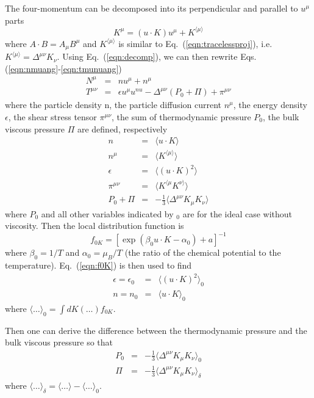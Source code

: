 \documentclass[aps,article]{revtex4}
\begin{document}
The four-momentum can be decomposed into its perpendicular and parallel to $u^{\mu}$ parts
\begin{equation}\label{eqn:decomp}
K^{\mu}=(u\cdot K)u^{\mu}+K^{\langle \mu\rangle}
\end{equation}
where $A\cdot B=A_{\mu}B^{\mu}$ and $K^{\langle \mu\rangle}$ is similar to Eq.\ (\ref{eqn:tracelessproj}), i.e. $K^{\langle \mu\rangle}=\Delta^{\mu\nu}K_{\nu}$.  Using Eq.\ (\ref{eqn:decomp}), we can then rewrite Eqs. (\ref{eqn:nmuang}-\ref{eqn:tmunuang})
\begin{eqnarray}
N^{\mu}&=& n u^{\mu}+n^{\mu}    \nonumber\\
T^{\mu\nu}&=& \epsilon u^{\mu}u^{nu}-\Delta^{\mu\nu}\left(P_0+\Pi\right)+\pi^{\mu\nu}
\end{eqnarray}
where the particle density n, the particle diffusion current $n^{\mu}$, the energy density $\epsilon$, the shear stress tensor $\pi^{\mu\nu}$, the sum of thermodynamic pressure $P_0$, the bulk viscous pressure $\Pi$ are defined, respectively
\begin{eqnarray}
n&=&\langle u\cdot K\rangle\nonumber\\
n^{\mu}&=&\langle K^{\langle \mu\rangle}\rangle\nonumber\\
\epsilon&=&\langle\left(u\cdot K\right)^2\rangle\nonumber\\
\pi^{\mu\nu}&=&\langle K^{\langle \mu}K^{\nu\rangle}\rangle\nonumber\\
P_0+\Pi&=&-\frac{1}{3}\langle \Delta^{\mu\nu}K_{\mu}K_{\nu}\rangle
\end{eqnarray}
where $P_0$ and all other variables indicated by $_0$ are for the ideal case without viscosity. Then the local distribution function is
\begin{equation}\label{eqn:f0K}
f_{0K}=\left[\exp\left(\beta_0u\cdot K-\alpha_0\right)+a\right]^{-1}
\end{equation}
where $\beta_0=1/T$ and $\alpha_0=\mu_B/T$ (the ratio of the chemical potential to the temperature). Eq.\ (\ref{eqn:f0K}) is then used to find
\begin{eqnarray}
\epsilon=\epsilon_0&=&\langle\left(u\cdot K\right)^2\rangle_0\nonumber\\
n=n_0&=&\langle u\cdot K\rangle_0
\end{eqnarray}
where $\langle \dots \rangle_0=\int dK \left(\dots\right) f_{0K}$.

Then one can derive the difference between the thermodynamic pressure and the bulk viscous pressure so that
\begin{eqnarray}
P_0&=&-\frac{1}{3}\langle\Delta^{\mu\nu}K_{\mu}K_{\nu}\rangle_0\nonumber\\
\Pi&=&-\frac{1}{3}\langle\Delta^{\mu\nu}K_{\mu}K_{\nu}\rangle_{\delta}
\end{eqnarray}
where $\langle \dots \rangle_{\delta}=\langle\dots\rangle-\langle\dots\rangle_0$.
\end{document}
